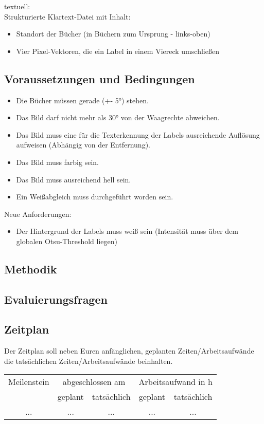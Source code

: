\documentclass[paper=A4, deutsch]{scrartcl}
\begin{document}
\noindent textuell:\\
Strukturierte Klartext-Datei mit Inhalt:
\begin{itemize}
  \item Standort der Bücher (in Büchern zum Ursprung - links-oben)
  \item Vier Pixel-Vektoren, die ein Label in einem Viereck umschließen
\end{itemize}

\subsection{Voraussetzungen und Bedingungen}
\begin{itemize}
  \item Die Bücher müssen gerade (+- 5°) stehen.
  \item Das Bild darf nicht mehr als 30° von der Waagrechte abweichen.
  \item Das Bild muss eine für die Texterkennung der Labels ausreichende Auflösung aufweisen (Abhängig von der Entfernung).
  \item Das Bild muss farbig sein.
  \item Das Bild muss ausreichend hell sein. 
  \item Ein Weißabgleich muss durchgeführt worden sein.
\end{itemize}

Neue Anforderungen:
\begin{itemize}
  \item Der Hintergrund der Labels muss weiß sein (Intensität muss über dem globalen Otsu-Threshold liegen)
\end{itemize}

\subsection{Methodik}
\subsection{Evaluierungsfragen}
\subsection{Zeitplan}
Der Zeitplan soll neben Euren anfänglichen, geplanten Zeiten/Arbeitsaufwände die tatsächlichen Zeiten/Arbeitsaufwände beinhalten. 
\begin{table}[h!]
	\centering
	\begin{tabular}{|c|c|c|c|c|}
		\hline
		Meilenstein & \multicolumn{2}{c|}{abgeschlossen am} & \multicolumn{2}{c|}{Arbeitsaufwand in h}\\
		\cline{2-5}
		 & geplant & tatsächlich & geplant & tatsächlich\\
		\hline
		...&... &... &... &...\\
		\hline
	\end{tabular}
\end{table}
\end{document}
